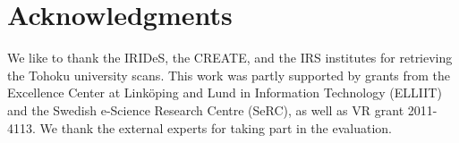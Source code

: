 \documentclass{egpubl}
\begin{document}


\section*{Acknowledgments}
We like to thank the IRIDeS, the CREATE, and the IRS institutes for retrieving the Tohoku university scans. This work was partly supported by grants from the Excellence Center at Link\"oping and Lund in Information Technology (ELLIIT) and the Swedish e-Science Research Centre (SeRC), as well as VR grant 2011-4113. We thank the external experts for taking part in the evaluation.

%


\end{document}
